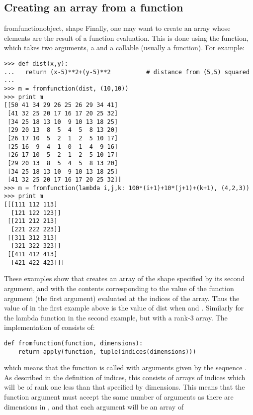 \subsection{Creating an array from a function}
\label{sec:creating-array-from-function}

\begin{funcdesc}{fromfunction}{object, shape} 
   Finally, one may want to create an array whose elements are the result
   of a function evaluation. This is done using the 
   function, which takes two arguments, a  and a callable
    (usually a function).  For example:
\begin{verbatim}
>>> def dist(x,y):
...   return (x-5)**2+(y-5)**2          # distance from (5,5) squared
...
>>> m = fromfunction(dist, (10,10))
>>> print m
[[50 41 34 29 26 25 26 29 34 41]
 [41 32 25 20 17 16 17 20 25 32]
 [34 25 18 13 10  9 10 13 18 25]
 [29 20 13  8  5  4  5  8 13 20]
 [26 17 10  5  2  1  2  5 10 17]
 [25 16  9  4  1  0  1  4  9 16]
 [26 17 10  5  2  1  2  5 10 17]
 [29 20 13  8  5  4  5  8 13 20]
 [34 25 18 13 10  9 10 13 18 25]
 [41 32 25 20 17 16 17 20 25 32]]
>>> m = fromfunction(lambda i,j,k: 100*(i+1)+10*(j+1)+(k+1), (4,2,3))
>>> print m
[[[111 112 113]
  [121 122 123]]
 [[211 212 213]
  [221 222 223]]
 [[311 312 313]
  [321 322 323]]
 [[411 412 413]
  [421 422 423]]]
\end{verbatim}
   These examples show that 
   creates an array of the shape specified by its second argument, and with the
   contents corresponding to the value of the function argument (the first
   argument) evaluated at the indices of the array. Thus the value of
    in the first example above is the value of dist when
    and .  Similarly for the lambda function in the second
   example, but with a rank-3 array.  The implementation of
    consists of:
\begin{verbatim}
def fromfunction(function, dimensions):
    return apply(function, tuple(indices(dimensions)))
\end{verbatim}
   which means that the function  is called with arguments
   given by the sequence . As described in the
   definition of indices, this consists of arrays of indices which will be of
   rank one less than that specified by dimensions. This means that the
   function argument must accept the same number of arguments as there are
   dimensions in , and that each argument will be an array of

\end{funcdesc}
